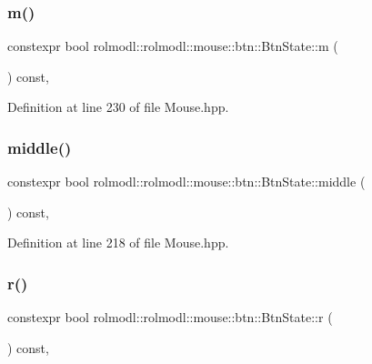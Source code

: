 \subsubsection{\texorpdfstring{m()}{m()}}
{\footnotesize\ttfamily constexpr bool rolmodl\+::rolmodl\+::mouse\+::btn\+::\+Btn\+State\+::m (\begin{DoxyParamCaption}{ }\end{DoxyParamCaption}) const\hspace{0.3cm}{\ttfamily [inline]}, {\ttfamily [noexcept]}}



Definition at line 230 of file Mouse.\+hpp.

\mbox{\label{structrolmodl_1_1rolmodl_1_1mouse_1_1btn_1_1_btn_state_a408eb39455a05ee298ad026e617c25ed}} 
\subsubsection{\texorpdfstring{middle()}{middle()}}
{\footnotesize\ttfamily constexpr bool rolmodl\+::rolmodl\+::mouse\+::btn\+::\+Btn\+State\+::middle (\begin{DoxyParamCaption}{ }\end{DoxyParamCaption}) const\hspace{0.3cm}{\ttfamily [inline]}, {\ttfamily [noexcept]}}



Definition at line 218 of file Mouse.\+hpp.

\mbox{\label{structrolmodl_1_1rolmodl_1_1mouse_1_1btn_1_1_btn_state_a54b06f68dfa6b7a7302f439bc3da97a8}} 
\subsubsection{\texorpdfstring{r()}{r()}}
{\footnotesize\ttfamily constexpr bool rolmodl\+::rolmodl\+::mouse\+::btn\+::\+Btn\+State\+::r (\begin{DoxyParamCaption}{ }\end{DoxyParamCaption}) const\hspace{0.3cm}{\ttfamily [inline]}, {\ttfamily [noexcept]}}



